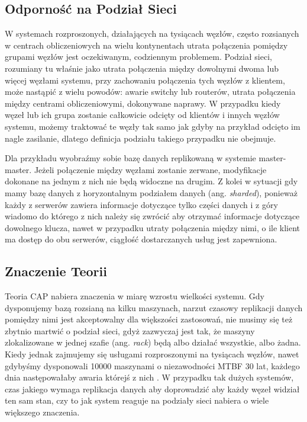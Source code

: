 \subsection*{Odporność na Podział Sieci}

W systemach rozproszonych, działających na tysiącach węzłów, często rozsianych w centrach obliczeniowych na wielu kontynentach utrata połączenia pomiędzy grupami węzłów jest oczekiwanym, codziennym problemem.
Podział sieci, rozumiany tu właśnie jako utrata połączenia między dowolnymi dwoma lub więcej węzłami systemu, przy zachowaniu połączenia tych węzłów z klientem, może nastąpić z wielu powodów: awarie switchy lub routerów, utrata połączenia między centrami obliczeniowymi, dokonywane naprawy.
W przypadku kiedy węzeł lub ich grupa zostanie całkowicie odcięty od klientów i innych węzłów systemu, możemy traktować te węzły tak samo jak gdyby na przykład odcięto im nagle zasilanie, dlatego definicja podziału takiego przypadku nie obejmuje.

Dla przykładu wyobraźmy sobie bazę danych replikowaną w systemie master-master.
Jeżeli połączenie między węzłami zostanie zerwane, modyfikacje dokonane na jednym z nich nie będą widoczne na drugim. 
Z kolei w sytuacji gdy mamy bazę danych z horyzontalnym podziałem danych (ang. \emph{sharded}), ponieważ każdy z serwerów zawiera informacje dotyczące tylko części danych i z góry wiadomo do którego z nich należy się zwrócić aby otrzymać informacje dotyczące dowolnego klucza, nawet w przypadku utraty połączenia między nimi, o ile klient ma dostęp do obu serwerów, ciągłość dostarczanych usług jest zapewniona.

\subsection*{Znaczenie Teorii}

Teoria CAP nabiera znaczenia w miarę wzrostu wielkości systemu. 
Gdy dysponujemy bazą rozsianą na kilku maszynach, narzut czasowy replikacji danych pomiędzy nimi jest akceptowalny dla większości zastosowań, nie musimy się też zbytnio martwić o podział sieci, gdyż zazwyczaj jest tak, że maszyny zlokalizowane w jednej szafie (ang. \emph{rack}) będą albo działać wszystkie, albo żadna. 
Kiedy jednak zajmujemy się usługami rozproszonymi na tysiącach węzłów, nawet gdybyśmy dysponowali 10000 maszynami o niezawodności MTBF 30 lat, każdego dnia następowałaby awaria którejś z nich \cite{google-lessons}. 
W przypadku tak dużych systemów, czas jakiego wymaga replikacja danych aby doprowadzić aby każdy węzeł widział ten sam stan, czy to jak system reaguje na podziały sieci nabiera o wiele większego znaczenia.

